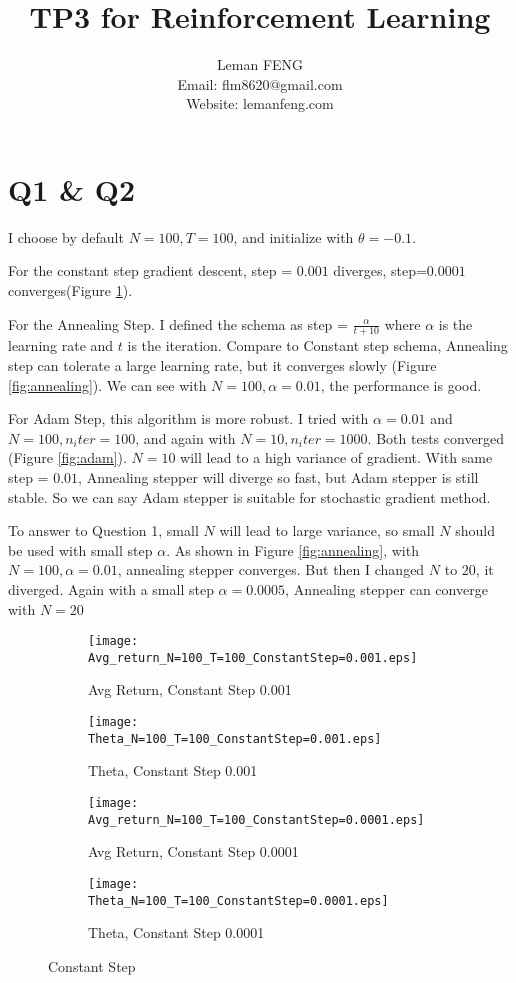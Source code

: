 \documentclass{article}
\title{TP3 for Reinforcement Learning}
\author{Leman FENG\\ Email: flm8620@gmail.com\\Website: lemanfeng.com}
\begin{document}
	\maketitle
	\section*{Q1 \& Q2}
	I choose by default $N=100, T=100$, and initialize with $\theta = -0.1$.
	
	For the constant step gradient descent, step = $0.001$ diverges, step=$0.0001$ converges(Figure \ref{fig:constant}).
	
	For the Annealing Step. I defined the schema as step = $\frac{\alpha}{t+10}$ where $\alpha$ is the learning rate and $t$ is the iteration. Compare to Constant step schema, Annealing step can tolerate a large learning rate, but it converges slowly (Figure \ref{fig:annealing}). We can see with $N=100, \alpha=0.01$, the performance is good.
	
	For Adam Step, this algorithm is more robust. I tried with $\alpha=0.01$ and $N=100, n_iter=100$, and again with $N=10, n_iter=1000$. Both tests converged (Figure \ref{fig:adam}). $N=10$ will lead to a high variance of gradient. With same step = $0.01$, Annealing stepper will diverge so fast, but Adam stepper is still stable. So we can say Adam stepper is suitable for stochastic gradient method.
	
	To answer to Question 1, small $N$ will lead to large variance, so small $N$ should be used with small step $\alpha$. As shown in Figure \ref{fig:annealing}, with $N=100, \alpha=0.01$, annealing stepper converges. But then I changed $N$ to $20$, it diverged. Again with a small step $\alpha=0.0005$, Annealing stepper can converge with $N=20$
	

	
	
	\begin{figure}
		\centering
		\begin{subfigure}[b]{0.49\textwidth}
			\centering
			\texttt{[image: Avg\_return\_N=100\_T=100\_ConstantStep=0.001.eps]}
			\caption{Avg Return, Constant Step 0.001}
		\end{subfigure}
		\begin{subfigure}[b]{0.49\textwidth}
			\centering
			\texttt{[image: Theta\_N=100\_T=100\_ConstantStep=0.001.eps]}
			\caption{Theta, Constant Step 0.001}
		\end{subfigure}
	
		\begin{subfigure}[b]{0.49\textwidth}
			\centering
			\texttt{[image: Avg\_return\_N=100\_T=100\_ConstantStep=0.0001.eps]}
			\caption{Avg Return, Constant Step 0.0001}
		\end{subfigure}
		\begin{subfigure}[b]{0.49\textwidth}
			\centering
			\texttt{[image: Theta\_N=100\_T=100\_ConstantStep=0.0001.eps]}
			\caption{Theta, Constant Step 0.0001}
		\end{subfigure}
	\caption{Constant Step}
	\label{fig:constant}
	\end{figure}
\end{document}
